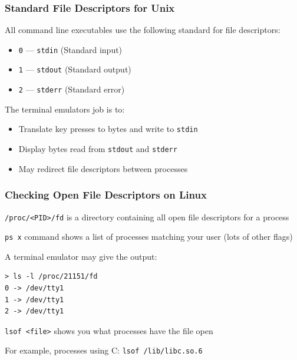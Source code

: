 \documentclass[aspectratio=169]{beamer}
\begin{document}
  \begin{frame}
    \frametitle{Standard File Descriptors for Unix}

    All command line executables use the following standard for file
    descriptors:

    \begin{itemize}
      \item \texttt{0} --- \texttt{stdin} (Standard input)
      \item \texttt{1} --- \texttt{stdout} (Standard output)
      \item \texttt{2} --- \texttt{stderr} (Standard error)
    \end{itemize}

    \vspace{2em}

    The terminal emulators job is to:
    \begin{itemize}
      \item Translate key presses to bytes and write to \texttt{stdin}
      \item Display bytes read from \texttt{stdout} and \texttt{stderr}
      \item May redirect file descriptors between processes
    \end{itemize}
  \end{frame}

  \begin{frame}[fragile]
    \frametitle{Checking Open File Descriptors on Linux}

    \texttt{/proc/<PID>/fd} \hspace{0.5em} is a directory containing all open
    file descriptors for a process

    \texttt{ps x} \hspace{0.5em} command shows a list of processes matching your
    user (lots of other flags)

    \vspace{1em}

    A terminal emulator may give the output:
    \begin{lstlisting}[basicstyle=\small\ttfamily]
> ls -l /proc/21151/fd
0 -> /dev/tty1
1 -> /dev/tty1
2 -> /dev/tty1
    \end{lstlisting}

    \vspace{2em}

    \texttt{lsof <file>} \hspace{0.5em} shows you what processes have the file
    open

    \hspace{2em} For example, processes using C: \hspace{0.5em}
    \texttt{lsof /lib/libc.so.6}
  \end{frame}
\end{document}
